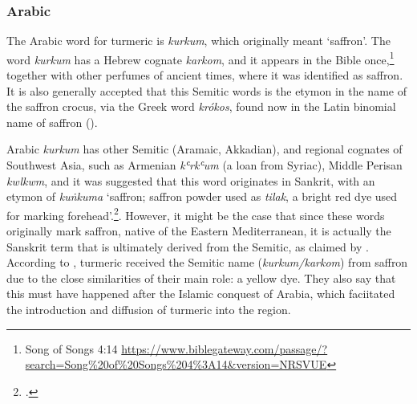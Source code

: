 


\subsubsection{Arabic}


	
The Arabic word for turmeric is \textit{kurkum}, which originally meant `saffron'. The word \textit{kurkum} has a Hebrew cognate \textit{karkom}, and it appears in the Bible once,\footnote{Song of Songs 4:14 \url{https://www.biblegateway.com/passage/?search=Song\%20of\%20Songs\%204\%3A14\&version=NRSVUE}} together with other perfumes of ancient times, where it was identified as saffron. It is also generally accepted that this Semitic words is the etymon in the name of the saffron crocus, via the Greek word  \textit{krókos}, found now in the Latin binomial name of saffron ().

Arabic \textit{kurkum} has other Semitic (Aramaic, Akkadian), and regional cognates of Southwest Asia, such as Armenian  \textit{kʿrkʿum} (a loan from Syriac), Middle Perisan \textit{kwlkwm}, and it was suggested that this word originates in Sankrit, with an etymon of \textit{kuṅkuma} `saffron; saffron powder used as \textit{tilak}, a bright red dye used for marking forehead'.\footcite[164 ]{turner_comparative_1962}. However, it might be the case that since these words originally mark saffron, native of the Eastern Mediterranean, it is actually the Sanskrit term that is ultimately derived from the Semitic, as claimed by \textcite{greppin_early_1987}. 
According to \textcite[108]{amar_arabian_2017}, turmeric received the Semitic name (\textit{kurkum/karkom}) from saffron due to the close similarities of their main role: a yellow dye. They also say that this must have happened after the Islamic conquest of Arabia, which faciitated the introduction and diffusion of turmeric into the region. 

